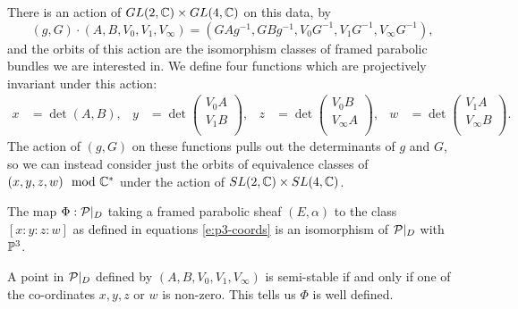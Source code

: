	There is an action of $GL(2,\mathbb{C})\times GL(4,\mathbb{C})$ on this data, by
	\begin{equation}
		\label{e:p3-conds}
		(g,G)\cdot (A,B,V_0,V_1,V_\infty) = (GAg^{-1}, GBg^{-1}, V_0G^{-1}, V_1G^{-1}, V_\infty G^{-1}),
	\end{equation}
	and the orbits of this action are the isomorphism classes of framed parabolic bundles we are interested in. We define four functions which are projectively invariant under this action:
	\begin{align}
		\label{e:p3-coords}
		x&=\det(A,B),& y&=\det\begin{pmatrix}
		V_0 A\\
		V_1 B\\
		\end{pmatrix}, & z&= \det\begin{pmatrix}
		V_0 B\\
		V_\infty A\\
		\end{pmatrix}, & w&= \det\begin{pmatrix}
		V_1 A\\
		V_\infty B\\
		\end{pmatrix}.
	\end{align}
	The action of $(g,G)$ on these functions pulls out the determinants of $g$ and $G$, so we can instead consider just the orbits of equivalence classes of $(x,y,z,w) \mod {\mathbb{C}}^\ast$ under the action of $SL(2,\mathbb{C})\times SL(4,\mathbb{C})$. 
	\begin{theorem}
		\label{t:p3-iso}
		The map $\Phi:\mathcal{P}|_D$ taking a framed parabolic sheaf $(E,\alpha)$ to the class $[x:y:z:w]$ as defined in equations \ref{e:p3-coords} is an isomorphism of $\mathcal{P}|_D$ with $\mathbb{P}^3$. 
	\end{theorem}
	\begin{lemma}
		A point in $\mathcal{P}|_D$ defined by $(A,B,V_0,V_1,V_\infty)$ is semi-stable if and only if one of the co-ordinates $x,y,z$ or $w$ is non-zero. This tells us $\Phi$ is well defined.
	\end{lemma}
